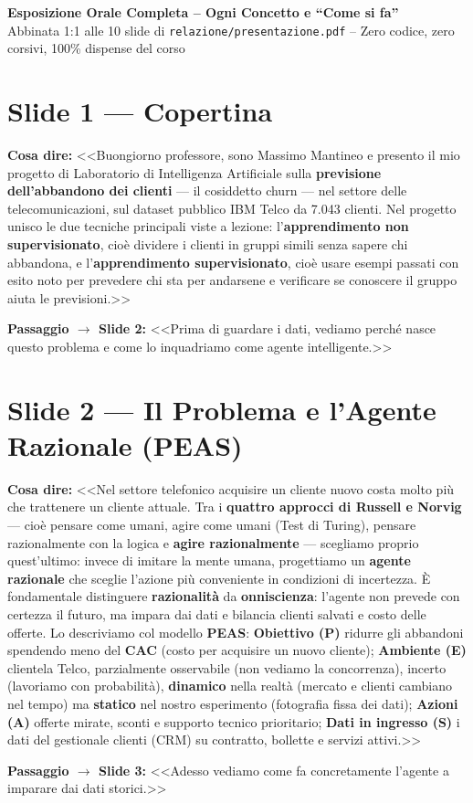 \documentclass[10pt, a4paper]{article}
\newcommand{\say}[1]{%
  \par\vspace{2pt}\noindent\colorbox{SoftBox}{\parbox{\dimexpr\linewidth-2\fboxsep}{\raggedright\small\textbf{\color{PrimaryNavy}Cosa dire:} #1}}\par\vspace{2pt}%
}
\newcommand{\pass}[2]{%
  \par\vspace{1pt}\noindent\colorbox{PassBox}{\parbox{\dimexpr\linewidth-2\fboxsep}{\raggedright\footnotesize\textbf{\color{AccentAmber}Passaggio $\rightarrow$ Slide #1:} <<#2>>}}\par%
}
\newcommand{\slideblock}[3]{%
  \noindent\begin{minipage}{\linewidth}
    \section*{#1}
    \say{#2}
    #3
  \end{minipage}\par\vspace{6pt}%
}
\begin{document}
\begin{center}
    {\Large \bfseries \color{PrimaryNavy} Esposizione Orale Completa -- Ogni Concetto e ``Come si fa''}\\[3pt]
    {\small Abbinata 1:1 alle 10 slide di \texttt{relazione/presentazione.pdf} -- Zero codice, zero corsivi, 100\% dispense del corso}
\end{center}
\vspace{2pt}

\slideblock{Slide 1 --- Copertina}{%
<<Buongiorno professore, sono Massimo Mantineo e presento il mio progetto di Laboratorio di Intelligenza Artificiale sulla \textbf{previsione dell'abbandono dei clienti} --- il cosiddetto churn --- nel settore delle telecomunicazioni, sul dataset pubblico IBM Telco da 7.043 clienti. Nel progetto unisco le due tecniche principali viste a lezione: l'\textbf{apprendimento non supervisionato}, cioè dividere i clienti in gruppi simili senza sapere chi abbandona, e l'\textbf{apprendimento supervisionato}, cioè usare esempi passati con esito noto per prevedere chi sta per andarsene e verificare se conoscere il gruppo aiuta le previsioni.>>%
}{\pass{2}{Prima di guardare i dati, vediamo perché nasce questo problema e come lo inquadriamo come agente intelligente.}}

\slideblock{Slide 2 --- Il Problema e l'Agente Razionale (PEAS)}{%
<<Nel settore telefonico acquisire un cliente nuovo costa molto più che trattenere un cliente attuale. Tra i \textbf{quattro approcci di Russell e Norvig} --- cioè pensare come umani, agire come umani (Test di Turing), pensare razionalmente con la logica e \textbf{agire razionalmente} --- scegliamo proprio quest'ultimo: invece di imitare la mente umana, progettiamo un \textbf{agente razionale} che sceglie l'azione più conveniente in condizioni di incertezza. È fondamentale distinguere \textbf{razionalità} da \textbf{onniscienza}: l'agente non prevede con certezza il futuro, ma impara dai dati e bilancia clienti salvati e costo delle offerte. Lo descriviamo col modello \textbf{PEAS}: \textbf{Obiettivo (P)} ridurre gli abbandoni spendendo meno del \textbf{CAC} (costo per acquisire un nuovo cliente); \textbf{Ambiente (E)} clientela Telco, parzialmente osservabile (non vediamo la concorrenza), incerto (lavoriamo con probabilità), \textbf{dinamico} nella realtà (mercato e clienti cambiano nel tempo) ma \textbf{statico} nel nostro esperimento (fotografia fissa dei dati); \textbf{Azioni (A)} offerte mirate, sconti e supporto tecnico prioritario; \textbf{Dati in ingresso (S)} i dati del gestionale clienti (CRM) su contratto, bollette e servizi attivi.>>%
}{\pass{3}{Adesso vediamo come fa concretamente l'agente a imparare dai dati storici.}}
\end{document}
